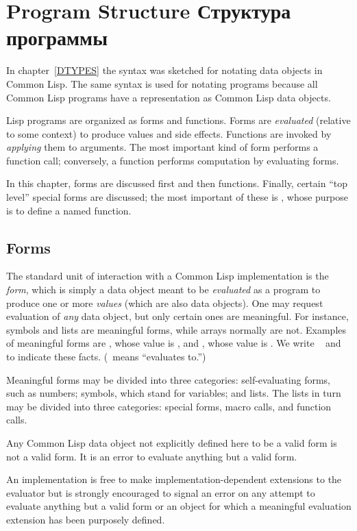 
\clearpage\def\pagestatus{FINAL PROOF}

\ifx \rulang\Undef
\chapter{Program Structure Структура программы}
\label{PROGS}

In chapter~\ref{DTYPES} the syntax was sketched for notating data objects
in Common Lisp.  The same syntax is used for notating programs because all
Common Lisp programs have a representation as Common Lisp data objects.

Lisp programs are organized as forms and functions.  Forms are
\emph{evaluated} (relative to some context) to produce values and side
effects.  Functions are invoked by \emph{applying} them to arguments.
The most important kind of form performs a function call;
conversely, a function performs computation by evaluating forms.

In this chapter, forms are discussed first and then functions.
Finally, certain ``top level'' special forms are discussed; the most
important of these is , whose purpose is to define a
named function.

\section{Forms}

The standard unit of interaction with a Common Lisp implementation is the \emph{form},
which is simply a data object meant to be \emph{evaluated} as a program
to produce one or more \emph{values} (which are also data objects).
One may request evaluation of \emph{any} data object, but only certain ones
are meaningful.  For instance,
symbols and lists are meaningful forms, while arrays
normally are not.  Examples of meaningful forms are ,
whose value is , and , whose value is .
We write  \EV\  and  \EV\ 
to indicate these facts.  (\EV\ means ``evaluates to.'')

Meaningful forms may be divided into three categories:
self-evaluating forms, such as numbers; symbols, which stand
for variables; and lists.  The lists in turn may be divided
into three categories: special forms, macro calls, and function calls.

\begin{obsolete}
Any Common Lisp data object not explicitly defined here to be a valid form
is not a valid form.  It is an error to evaluate
anything but a valid form.

\beforenoterule
\begin{implementation}
An implementation is free to make
implementation-dependent extensions to the evaluator but is
strongly encouraged to signal an error on any attempt to
evaluate anything but a valid form or an object for which
a meaningful evaluation extension has been purposely defined.
\end{implementation}
\afternoterule
\end{obsolete}

